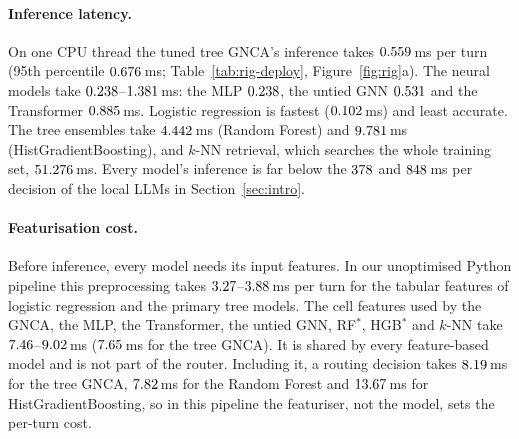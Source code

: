 \documentclass[10pt,twocolumn,letterpaper]{article}
\begin{document}
\paragraph{Inference latency.} On one CPU thread the tuned tree GNCA's inference takes $0.559$\,ms per turn (95th percentile $0.676$\,ms; Table~\ref{tab:rig-deploy}, Figure~\ref{fig:rig}a). The neural models take $0.238$--$1.381$\,ms: the MLP $0.238$, the untied GNN $0.531$ and the Transformer $0.885$\,ms. Logistic regression is fastest ($0.102$\,ms) and least accurate. The tree ensembles take $4.442$\,ms (Random Forest) and $9.781$\,ms (HistGradientBoosting), and $k$-NN retrieval, which searches the whole training set, $51.276$\,ms. Every model's inference is far below the $378$ and $848$\,ms per decision of the local LLMs in Section~\ref{sec:intro}.

\paragraph{Featurisation cost.} Before inference, every model needs its input features. In our unoptimised Python pipeline this preprocessing takes $3.27$--$3.88$\,ms per turn for the tabular features of logistic regression and the primary tree models. The cell features used by the GNCA, the MLP, the Transformer, the untied GNN, RF$^\ast$, HGB$^\ast$ and $k$-NN take $7.46$--$9.02$\,ms ($7.65$\,ms for the tree GNCA). It is shared by every feature-based model and is not part of the router. Including it, a routing decision takes $8.19$\,ms for the tree GNCA, $7.82$\,ms for the Random Forest and $13.67$\,ms for HistGradientBoosting, so in this pipeline the featuriser, not the model, sets the per-turn cost.

\begin{table}[t]
\centering
\scriptsize
\caption{Head-to-head CPU efficiency across all four benchmarks and all thirteen models (five seeds, median over seeds). All models were refitted on CPU at their selected configurations; Train$_8$ is wall-clock training time on 8 physical cores (1-thread training in the released summary file), Infer is 1-thread batch-1 model forward/predict time (1{,}000 turns after 50 warm-up turns; featurisation excluded).}
\label{tab:efficiency-1118}

\end{table}
\end{document}
